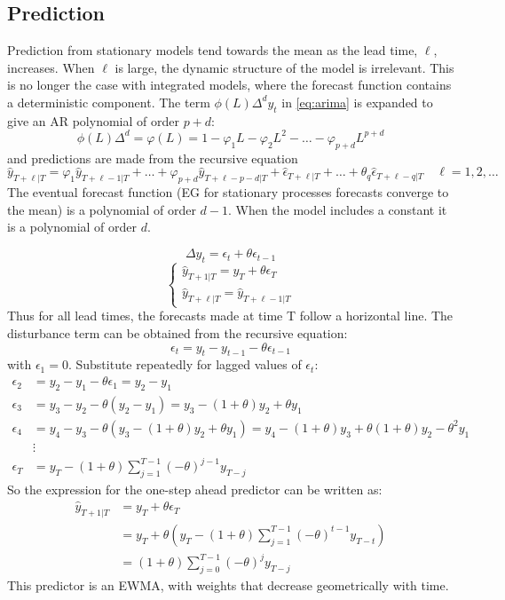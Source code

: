 \documentclass[DIV=14,titlepage=false]{scrreprt}
\begin{document}
\subsection{Prediction}
Prediction from stationary models tend towards the mean as the lead time, $\ell$, increases. When $\ell$ is large, the dynamic structure of the model is irrelevant. This is no longer the case with integrated models, where the forecast function contains a deterministic component. The term $\phi(L)\Delta^d y_t$ in \eqref{eq:arima} is expanded to give an AR polynomial of order $p+d$:
\[
    \phi (L) \Delta^d = \varphi (L) = 1 - \varphi_1 L - \varphi_2 L^2 - \ldots - \varphi_{p+d} L^{p+d}
\]
and predictions are made from the recursive equation
\[
    \hat{y}_{T+\ell|T} = \varphi_1 \hat{y}_{T+\ell-1|T}  + \ldots + \varphi_{p+d} \hat{y}_{T+\ell-p-d|T} + \hat \epsilon_{T+\ell|T} + \ldots + \theta_q \hat \epsilon_{T+\ell-q|T} \quad \ell = 1,2,\ldots
    \]
The eventual forecast function (EG for stationary processes forecasts converge to the mean) is a polynomial of order $d-1$. When the model includes a constant it is a polynomial of order $d$. 
\begin{example}
    \[
        \Delta y_t = \epsilon_t + \theta \epsilon_{t-1} 
    \]
    \[
        \begin{cases*}
            \hat{y}_{T+1|T} = y_T + \theta \epsilon_T\\
            \hat{y}_{T+\ell|T} = \hat y_{T+\ell-1|T}
        \end{cases*}
    \]
    Thus for all lead times, the forecasts made at time T follow a horizontal line. The disturbance term can be obtained from the recursive equation:
    \[
        \epsilon_t = y_t - y_{t-1} - \theta \epsilon_{t-1}
    \]
    with $\epsilon_1 = 0$. Substitute repeatedly for lagged values of $\epsilon_t$:
    \begin{align*}
        \epsilon_2 &= y_2 - y_1 - \theta \epsilon_1 = y_2 - y_1\\
        \epsilon_3 &= y_3 - y_2 - \theta (y_2 - y_1) = y_3 - (1+\theta)y_2 + \theta y_1\\
        \epsilon_4 &= y_4 - y_3 - \theta (y_3 - (1+\theta)y_2 + \theta y_1) = y_4 - (1+\theta)y_3 + \theta(1+\theta)y_2 - \theta^2 y_1\\
        &\vdots\\
        \epsilon_T &= y_T - (1+\theta) \sum_{j=1}^{T-1} (-\theta)^{j-1} y_{T-j}
    \end{align*}
    So the expression for the one-step ahead predictor can be written as:
    \begin{align*}
        \hat{y}_{T+1|T} &= y_T + \theta \epsilon_T\\
        &= y_T + \theta \left( y_T - (1+\theta) \sum_{j=1}^{T-1} (-\theta)^{t-1} y_{T-t} \right)\\
        &= (1+\theta) \sum_{j=0}^{T-1} (-\theta)^{j} y_{T-j}
    \end{align*}
    This predictor is an EWMA, with weights that decrease geometrically with time.
\end{example}
\end{document}
